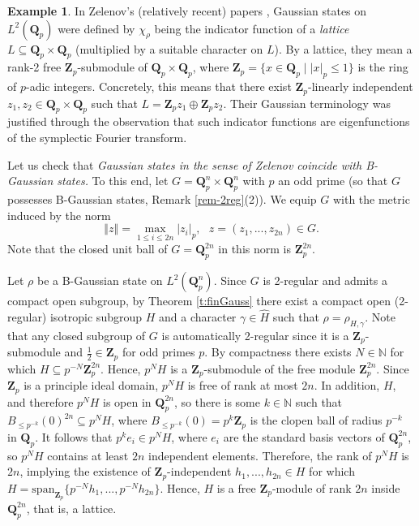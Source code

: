 \documentclass[12pt,reqno]{amsart}
\theoremstyle{definition}
\newtheorem{ex}[thm]{Example}
\theoremstyle{definition}
\theoremstyle{definition}
\numberwithin{thm}{section}
\numberwithin{equation}{section}
\newcommand{\norm}[1]{\left\Vert#1\right\Vert}
\newcommand{\bN}{\mathbb{N}}
\begin{document}
\begin{ex} 
In Zelenov's (relatively recent) papers \cite{Z,Z2}, Gaussian states on $L^2(\textbf{Q}_p)$ were defined by $\chi_\rho$ being the indicator function of a \textit{lattice} $L\subseteq \mathbf{Q}_p\times\mathbf{Q}_p$ (multiplied by a suitable character on $L$). By a lattice, they mean a rank-2 free $\mathbf{Z}_p$-submodule of $\mathbf{Q}_p\times\mathbf{Q}_p$, where $\mathbf{Z}_p=\{x\in\mathbf{Q}_p\mid |x|_p\leq 1\}$ is the ring of $p$-adic integers. Concretely, this means that there exist $\textbf{Z}_p$-linearly independent $z_1,z_2\in\mathbf{Q}_p\times\mathbf{Q}_p$ such that $L=\mathbf{Z}_p z_1\oplus\mathbf{Z}_p z_2$. Their Gaussian terminology was justified through the observation that such indicator functions are eigenfunctions of the symplectic Fourier transform.

Let us check that \textit{Gaussian states in the sense of Zelenov coincide with B-Gaussian states.} %
To this end, let $G=\mathbf{Q}_p^n\times\mathbf{Q}_p^n$ with $p$ an odd prime (so that $G$ possesses B-Gaussian states, Remark \ref{rem-2reg}(2)). We equip $G$ with the metric induced by the norm
$$\norm{z}=\max_{1\leq i\leq 2n}|z_i|_p, \ \ \ z=(z_1,...,z_{2n})\in G.$$
Note that the closed unit ball of $G=\mathbf{Q}_p^{2n}$ in this norm is $\mathbf{Z}_p^{2n}$.

Let $\rho$ be a B-Gaussian state on $L^2(\mathbf{Q}_p^n)$. Since $G$ is 2-regular and admits a compact open subgroup, by Theorem \ref{t:finGauss} there exist a compact open (2-regular) isotropic subgroup $H$ and a character $\gamma\in\widehat{H}$ such that $\rho=\rho_{H,\gamma}$. Note that any closed subgroup of $G$ is automatically 2-regular since it is a $\mathbf{Z}_p$-submodule and $\frac{1}{2}\in\mathbf{Z}_p$ for odd primes $p$. By compactness there exists $N\in\bN$ for which $H\subseteq p^{-N}\mathbf{Z}_p^{2n}$. Hence, $p^{N}H$ is a $\mathbf{Z}_p$-submodule of the free module $\mathbf{Z}_p^{2n}$. Since $\mathbf{Z}_p$ is a principle ideal domain, $p^{N}H$ is free of rank at most $2n$. In addition, $H$, and therefore $p^{N}H$ is open in $\mathbf{Q}_p^{2n}$, so there is some $k\in \bN$ such that $B_{\leq p^{-k}}(0)^{2n}\subseteq p^{N}H$, where $B_{\leq p^{-k}}(0)=p^k\mathbf{Z}_p$ is the clopen ball of radius $p^{-k}$ in $\mathbf{Q}_p$. It follows that $p^{k}e_i\in p^{N}H$, where $e_i$ are the standard basis vectors of $\mathbf{Q}_p^{2n}$, so $p^{N}H$ contains at least $2n$ independent elements. Therefore, the rank of $p^{N}H$ is $2n$, implying the existence of $\mathbf{Z}_p$-independent $h_1,...,h_{2n}\in H$ for which $H=\mathrm{span}_{\mathbf{Z}_p}\{p^{-N}h_1,...,p^{-N}h_{2n}\}$. Hence, $H$ is a free $\mathbf{Z}_p$-module of rank $2n$ inside $\mathbf{Q}_p^{2n}$, that is, a lattice.


\end{ex}
\end{document}
